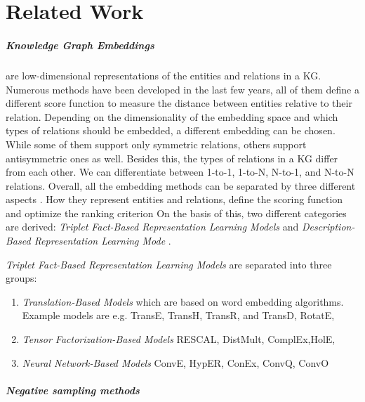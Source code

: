 \chapter{Related Work}
\label{ch:relatedwork}

\paragraph{Knowledge Graph Embeddings} 
are low-dimensional representations of the entities and relations in a \ac{KG}. 
Numerous methods have been developed in the last few years, all of them define a different score function to measure the distance between entities relative to their relation.
Depending on the dimensionality of the embedding space and which types of relations should be embedded, a different embedding can be chosen.
While some of them support only symmetric relations, others support antisymmetric ones as well. 
Besides this, the types of relations in a \ac{KG} differ from each other.
We can differentiate between 1-to-1, 1-to-N, N-to-1, and N-to-N relations.
Overall, all the embedding methods can be separated by three different aspects \cite{electronics9050750}.
How they represent entities and relations, define the scoring function and optimize the ranking criterion
On the basis of this, two different categories are derived:
\textit{Triplet Fact-Based Representation Learning Models} and \textit{Description-Based Representation Learning Mode} \cite{electronics9050750}.

\textit{Triplet Fact-Based Representation Learning Models} are separated into three groups:
\begin{enumerate}
    \item 
    \textit{Translation-Based Models}  which are based on word embedding algorithms. 
    Example models are e.g. TransE, TransH, TransR, and TransD, RotatE,
    
    \item 
    \textit{Tensor Factorization-Based Models}
    RESCAL, DistMult, ComplEx,HolE,
    
    \item 
    \textit{Neural Network-Based Models}
    ConvE, HypER, ConEx, ConvQ, ConvO
\end{enumerate}

\paragraph{Negative sampling methods}  

